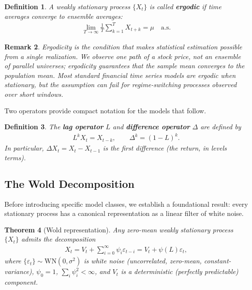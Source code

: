 \documentclass{report}
\theoremstyle{spacedplain}
\newtheorem{theorem}{Theorem}[section]
\theoremstyle{spaceddefinition}
\newtheorem{definition}[theorem]{Definition}
\theoremstyle{spacedremark}
\newtheorem{remark}[theorem]{Remark}
\begin{document}
\begin{definition}
A weakly stationary process $\{X_t\}$ is called \textbf{ergodic} if time averages converge to ensemble averages:
\begin{align}
    \lim_{T \to \infty} \frac{1}{T} \sum_{k=1}^{T} X_{t+k} = \mu \quad \text{a.s.}
\end{align}
\end{definition}

\begin{remark}
Ergodicity is the condition that makes statistical estimation possible from a single realization. We observe one path of a stock price, not an ensemble of parallel universes; ergodicity guarantees that the sample mean converges to the population mean. Most standard financial time series models are ergodic when stationary, but the assumption can fail for regime-switching processes observed over short windows.
\end{remark}

Two operators provide compact notation for the models that follow.

\begin{definition}
The \textbf{lag operator} $L$ and \textbf{difference operator} $\Delta$ are defined by
\begin{align}
    L^k X_t = X_{t-k}, \qquad \Delta^k = (1-L)^k.
\end{align}
In particular, $\Delta X_t = X_t - X_{t-1}$ is the first difference (the return, in levels terms).
\end{definition}


\subsection{The Wold Decomposition}

Before introducing specific model classes, we establish a foundational result: every stationary process has a canonical representation as a linear filter of white noise.

\begin{theorem}[Wold representation]
Any zero-mean weakly stationary process $\{X_t\}$ admits the decomposition
\begin{align}
    X_t = V_t + \sum_{i=0}^{\infty} \psi_i \varepsilon_{t-i} = V_t + \psi(L)\varepsilon_t,
\end{align}
where $\{\varepsilon_t\} \sim \text{WN}(0, \sigma^2)$ is white noise (uncorrelated, zero-mean, constant-variance), $\psi_0 = 1$, $\sum_i \psi_i^2 < \infty$, and $V_t$ is a deterministic (perfectly predictable) component.
\end{theorem}
\end{document}
